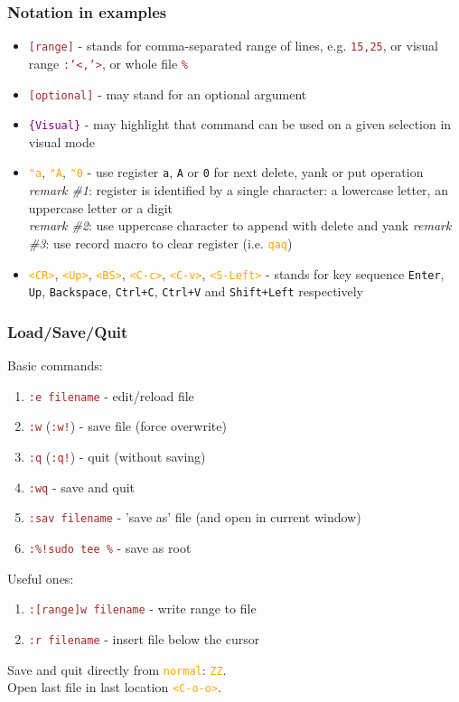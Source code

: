 \documentclass{beamer}
\newcommand{\vimnormal}[1]{\texttt{\textcolor{orange}{#1}}}
\newcommand{\vimcommand}[1]{\texttt{\textcolor{brown}{#1}}}
\newcommand{\vimvisual}[1]{\texttt{\textcolor{purple}{#1}}}
\newcommand{\vimkey}[1]{\textless{}#1\textgreater{}}
\begin{document}
\begin{frame}[fragile]
    \frametitle{Notation in examples}
    {\footnotesize
    \begin{itemize}
        \item \vimcommand{[range]} - stands for comma-separated range of lines, e.g. \vimcommand{15,25}, or visual range \vimcommand{:'\textless{},'\textgreater{}}, or whole file \vimcommand{\%}
        \item \vimcommand{[optional]} - may stand for an optional argument
        \item \vimvisual{\{Visual\}} - may highlight that command can be used on a given selection in visual mode
        \item \vimnormal{"a}, \vimnormal{"A}, \vimnormal{"0} - use register \texttt{a}, \texttt{A} or \texttt{0} for next delete, yank or put operation\\
          \textit{remark \#1}: register is identified by a single character: a lowercase letter, an uppercase letter or a digit\\
          \textit{remark \#2}: use uppercase character to append with delete and yank
          \textit{remark \#3}: use record macro to clear register (i.e. \vimnormal{qaq})
        \item \vimnormal{\vimkey{CR}}, \vimnormal{\vimkey{Up}}, \vimnormal{\vimkey{BS}}, \vimnormal{\vimkey{C-c}}, \vimnormal{\vimkey{C-v}}, \vimnormal{\vimkey{S-Left}} - stands for key sequence \texttt{Enter}, \texttt{Up}, \texttt{Backspace}, \texttt{Ctrl+C}, \texttt{Ctrl+V} and \texttt{Shift+Left} respectively
    \end{itemize}
    }
\end{frame}

\begin{frame}
    \frametitle{Load/Save/Quit}
    Basic commands:
    \begin{enumerate}
        \item \vimcommand{:e filename} - edit/reload file
        \item \vimcommand{:w} (\vimcommand{:w!}) - save file (force overwrite)
        \item \vimcommand{:q} (\vimcommand{:q!}) - quit (without saving)
        \item \vimcommand{:wq} - save and quit
        \item \vimcommand{:sav filename} - 'save as' file (and open in current window)
        \item \vimcommand{:\%!sudo tee \%} - save as root
    \end{enumerate}
    Useful ones:
    \begin{enumerate}
        \item \vimcommand{:[range]w filename} - write range to file
        \item \vimcommand{:r filename} - insert file below the cursor
    \end{enumerate}
    Save and quit directly from \vimnormal{normal}: \vimnormal{ZZ}.\\
    Open last file in last location \vimnormal{\vimkey{C-o-o}}.
\end{frame}
\end{document}
